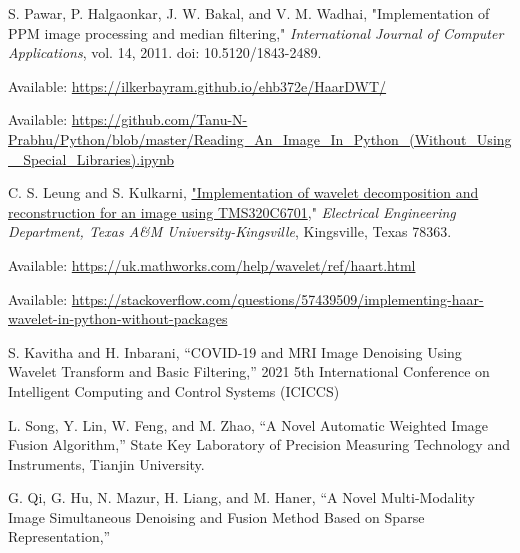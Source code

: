 \documentclass[
  11pt,
]{article}
\begin{document}
\begin{thebibliography}{}
S. Pawar, P. Halgaonkar, J. W. Bakal, and V. M. Wadhai, 
"Implementation of PPM image processing and median filtering," 
\textit{International Journal of Computer Applications}, 
vol. 14, 2011. 
doi: 10.5120/1843-2489.

\bibitem 
Available: \url{https://ilkerbayram.github.io/ehb372e/HaarDWT/}

\bibitem
Available: \url{https://github.com/Tanu-N-Prabhu/Python/blob/master/Reading\_An\_Image\_In\_Python\_(Without\_Using\_
Special\_Libraries).ipynb}

\bibitem{}
C. S. Leung and S. Kulkarni, \url{"Implementation of wavelet decomposition and reconstruction for an image using TMS320C6701}," \textit{Electrical Engineering Department, Texas A\&M University-Kingsville}, Kingsville, Texas 78363.

\bibitem{}
Available: \url{https://uk.mathworks.com/help/wavelet/ref/haart.html}

\bibitem{}
Available: \url{https://stackoverflow.com/questions/57439509/implementing-haar-wavelet-in-python-without-packages}

\bibitem {}
S. Kavitha and H. Inbarani, “COVID-19 and MRI Image Denoising Using Wavelet Transform and Basic Filtering,” 2021 5th International Conference on Intelligent Computing and Control Systems (ICICCS)

\bibitem{}
L. Song, Y. Lin, W. Feng, and M. Zhao, “A Novel Automatic Weighted Image Fusion Algorithm,” State Key Laboratory of Precision Measuring Technology and Instruments, Tianjin University.

\bibitem{}
G. Qi, G. Hu, N. Mazur, H. Liang, and M. Haner, “A Novel Multi-Modality Image Simultaneous Denoising and Fusion Method Based on Sparse Representation,”

\end{thebibliography}
\end{document}
